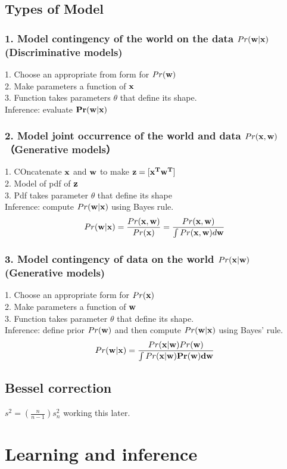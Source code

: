 \documentclass[12pt,a4paper]{article}
\begin{document}
\subsection*{Types of Model}
\subsubsection*{1. Model contingency of the world on the data $Pr({\bf w|x})$ (Discriminative models)}
1. Choose an appropriate from form for $Pr(\bf w)$\\
2. Make parameters a function of $\bf x$\\
3. Function takes parameters $\theta$ that define its shape.\\
Inference: evaluate $\bf Pr(w|x)$
\subsubsection*{2. Model joint occurrence of the world and data $Pr({\bf x,w})$ （Generative models）}
1. COncatenate $\bf x$ and $\bf w$ to make $\bf z=[x^T w^T]$\\
2. Model of pdf of $\bf z$\\
3. Pdf takes parameter $\theta$ that define its shape\\
Inference: compute $Pr({\bf w|x})$ using Bayes rule.
$$
Pr({\bf w|x}) = \frac{Pr({\bf x,w})}{Pr({\bf x})}= \frac{Pr({\bf x,w})}{\int Pr({\bf x,w})d{\bf w}}
$$
\subsubsection*{3. Model contingency of data on the world $Pr({\bf x|w})$ (Generative models)}
1. Choose an appropriate form for $Pr({\bf x})$\\
2. Make parameters a function of $\bf w$\\
3. Function takes parameter $\theta$ that define its shape.\\
Inference: define prior $Pr({\bf w})$ and then compute $Pr({\bf w|x})$ using Bayes' rule.
$$
Pr({\bf w|x}) = \frac{Pr({\bf x|w})Pr({\bf w})}{\int Pr(\bf x|w)Pr({\bf w})d{\bf w}}
$$
\subsection*{Bessel correction}
$s^2 = (\frac{n}{n-1})s_n^2$
working this later.
\section*{Learning and inference}
\end{document}
